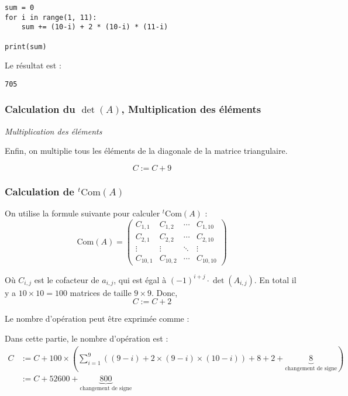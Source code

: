 \documentclass{article}
\begin{document}
\begin{lstlisting}
sum = 0
for i in range(1, 11):
    sum += (10-i) + 2 * (10-i) * (11-i)

print(sum)
\end{lstlisting}

Le résultat est :
\begin{lstlisting}
705
\end{lstlisting}
\subsubsection{Calculation du $\det(A)$, Multiplication des éléments} 
\noindent\textit{Multiplication des éléments}

Enfin, on multiplie tous les éléments de la diagonale de la matrice triangulaire.
\begin{tcolorbox}
\[
C := C + 9
\]
    
\end{tcolorbox}


\subsubsection{Calculation de $^t \text{Com}(A)$}

On utilise la formule suivante pour calculer $^t \text{Com}(A)$ :
\[
\text{Com}(A) = \begin{pmatrix}
    C_{1, 1} & C_{1, 2} & \cdots & C_{1, 10} \\
    C_{2, 1} & C_{2, 2} & \cdots & C_{2, 10} \\
    \vdots & \vdots & \ddots & \vdots \\
    C_{10, 1} & C_{10, 2} & \cdots & C_{10, 10}
\end{pmatrix}
\]

Où $C_{i, j}$ est le cofacteur de $a_{i, j}$, qui est égal à $(-1)^{i+j} \cdot \det(A_{i, j})$. En total il y a $10 \times 10 = 100$ matrices de taille $9 \times 9$. Donc, 
\[
C := C + 2
\]

Le nombre d'opération peut être exprimée comme :

\begin{tcolorbox}
    Dans cette partie, le nombre d'opération est :
    \begin{align*}
        C &:= C + 100 \times \left( \sum_{i=1}^{9} ((9-i) + 2 \times  (9 - i) \times  (10 -i))+ 8 + 2+ \underbrace{8}_{\text{changement de signe}}\right)  \\
          &:= C + 52600 + \underbrace{800}_{\text{changement de signe}}
    \end{align*}
\end{tcolorbox}
\end{document}
